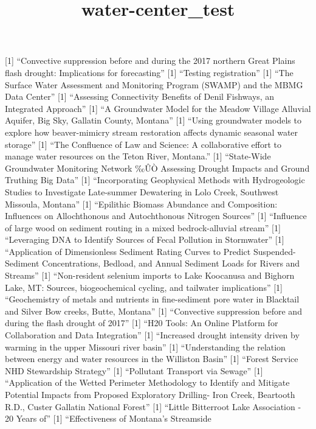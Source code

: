 \documentclass[]{article}
\title{water-center\_test}
\author{}
\date{}
\begin{document}
\maketitle

{[}1{]} ``Convective suppression before and during the 2017 northern
Great Plains flash drought: Implications for forecasting'' {[}1{]}
``Testing registration'' {[}1{]} ``The Surface Water Assessment and
Monitoring Program (SWAMP) and the MBMG Data Center'' {[}1{]}
``Assessing Connectivity Benefits of Denil Fishways, an Integrated
Approach'' {[}1{]} ``A Groundwater Model for the Meadow Village Alluvial
Aquifer, Big Sky, Gallatin County, Montana'' {[}1{]} ``Using groundwater
models to explore how beaver-mimicry stream restoration affects dynamic
seasonal water storage'' {[}1{]} ``The Confluence of Law and Science: A
collaborative effort to manage water resources on the Teton River,
Montana.'' {[}1{]} ``State-Wide Groundwater Monitoring Network ‰ÛÒ
Assessing Drought Impacts and Ground Truthing Big Data'' {[}1{]}
``Incorporating Geophysical Methods with Hydrogeologic Studies to
Investigate Late-summer Dewatering in Lolo Creek, Southwest Missoula,
Montana'' {[}1{]} ``Epilithic Biomass Abundance and Composition:
Influences on Allochthonous and Autochthonous Nitrogen Sources'' {[}1{]}
``Influence of large wood on sediment routing in a mixed
bedrock-alluvial stream'' {[}1{]} ``Leveraging DNA to Identify Sources
of Fecal Pollution in Stormwater'' {[}1{]} ``Application of
Dimensionless Sediment Rating Curves to Predict Suspended-Sediment
Concentrations, Bedload, and Annual Sediment Loads for Rivers and
Streams'' {[}1{]} ``Non-resident selenium imports to Lake Koocanusa and
Bighorn Lake, MT: Sources, biogeochemical cycling, and tailwater
implications'' {[}1{]} ``Geochemistry of metals and nutrients in
fine-sediment pore water in Blacktail and Silver Bow creeks, Butte,
Montana'' {[}1{]} ``Convective suppression before and during the flash
drought of 2017'' {[}1{]} ``H20 Tools: An Online Platform for
Collaboration and Data Integration'' {[}1{]} ``Increased drought
intensity driven by warming in the upper Missouri river basin'' {[}1{]}
``Understanding the relation between energy and water resources in the
Williston Basin'' {[}1{]} ``Forest Service NHD Stewardship Strategy''
{[}1{]} ``Pollutant Transport via Sewage'' {[}1{]} ``Application of the
Wetted Perimeter Methodology to Identify and Mitigate Potential Impacts
from Proposed Exploratory Drilling- Iron Creek, Beartooth R.D., Custer
Gallatin National Forest'' {[}1{]} ``Little Bitterroot Lake Association
- 20 Years of'' {[}1{]} ``Effectiveness of Montana's Streamside
\end{document}
